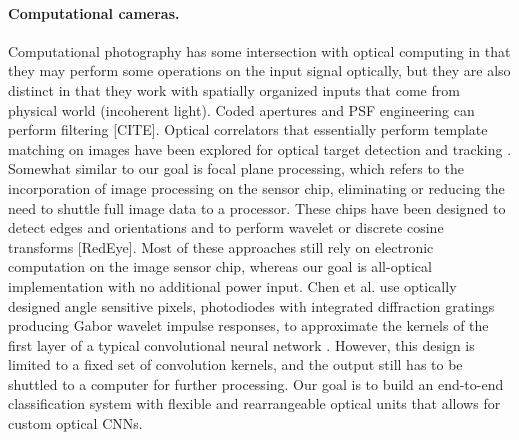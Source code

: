 \paragraph{Computational cameras.} Computational photography has some intersection with optical computing in that they may perform some operations on the input signal optically, but they are also distinct in that they work with spatially organized inputs that come from physical world (incoherent light). Coded apertures and PSF engineering can perform filtering [CITE]. Optical correlators that essentially perform template matching on images have been explored for optical target detection and tracking \cite{manzur2012optical, javidi1995optical}. Somewhat similar to our goal is focal plane processing, which refers to the incorporation of image processing on the sensor chip, eliminating or reducing the need to shuttle full image data to a processor. These chips have been designed to detect edges and orientations and to perform wavelet or discrete cosine transforms \cite{gruev2002implementation} [RedEye]. Most of these approaches still rely on electronic computation on the image sensor chip, whereas our goal is all-optical implementation with no additional power input. Chen et al. use optically designed angle sensitive pixels, photodiodes with integrated diffraction gratings producing Gabor wavelet impulse responses, to approximate the kernels of the first layer of a typical convolutional neural network \cite{chen2016asp}. However, this design is limited to a fixed set of convolution kernels, and the output still has to be shuttled to a computer for further processing. Our goal is to build an end-to-end classification system with flexible and rearrangeable optical units that allows for custom optical CNNs.